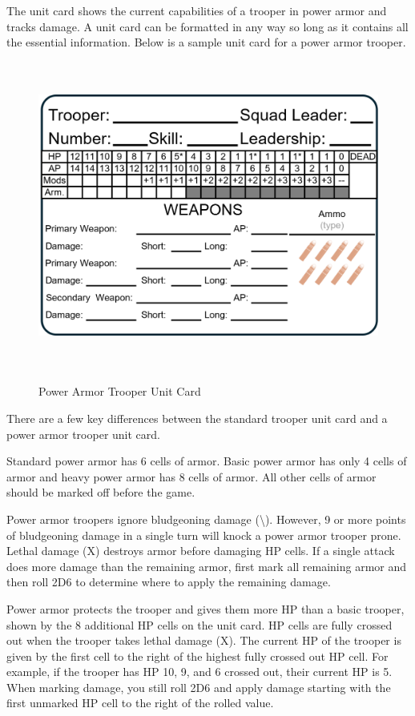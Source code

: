 The unit card shows the current capabilities of a trooper in power armor and tracks damage.
A unit card can be formatted in any way so long as it contains all the essential information.
Below is a sample unit card for a power armor trooper.

\begin{figure}[H]
  \centering
  \includegraphics[alt='Sample Power Armor Trooper', width=5.63in, height=4in]{img/PowerArmorTrooper.png}
  \caption*{Power Armor Trooper Unit Card}
\end{figure}

There are a few key differences between the standard trooper unit card and a power armor trooper unit card.

Standard power armor has 6 cells of armor.
Basic power armor has only 4 cells of armor and heavy power armor has 8 cells of armor.
All other cells of armor should be marked off before the game.

Power armor troopers ignore bludgeoning damage (\textbackslash).
However, 9 or more points of bludgeoning damage in a single turn will knock a power armor trooper prone.
Lethal damage (X) destroys armor before damaging HP cells.
If a single attack does more damage than the remaining armor, first mark all remaining armor and then roll 2D6 to determine where to apply the remaining damage.

Power armor protects the trooper and gives them more HP than a basic trooper, shown by the 8 additional HP cells on the unit card.
HP cells are fully crossed out when the trooper takes lethal damage (X).
The current HP of the trooper is given by the first cell to the right of the highest fully crossed out HP cell.
For example, if the trooper has HP 10, 9, and 6 crossed out, their current HP is 5.
When marking damage, you still roll 2D6 and apply damage starting with the first unmarked HP cell to the right of the rolled value.

